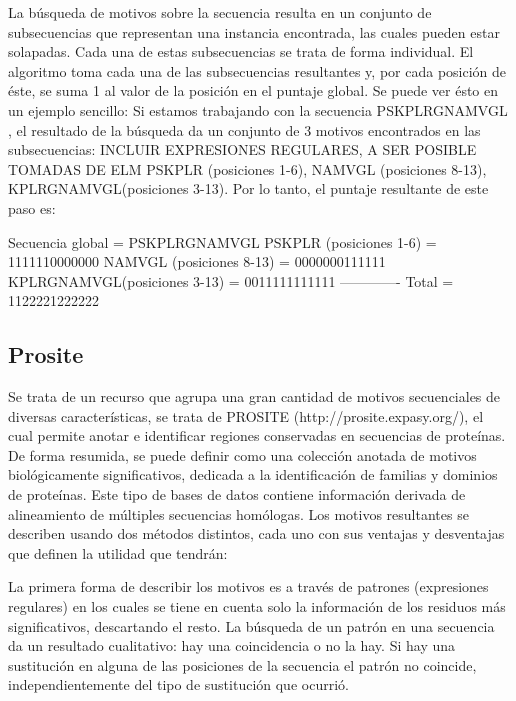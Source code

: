La búsqueda de motivos sobre la secuencia resulta en un conjunto de subsecuencias que representan una instancia encontrada, las cuales pueden estar solapadas. Cada una de estas subsecuencias se trata de forma individual.
El algoritmo toma cada una de las subsecuencias resultantes y, por cada posición de éste, se suma 1 al valor de la posición en el puntaje global.
Se puede ver ésto en un ejemplo sencillo:
Si estamos trabajando con la secuencia PSKPLRGNAMVGL , el resultado de la búsqueda da un conjunto de 3 motivos encontrados en las subsecuencias: INCLUIR EXPRESIONES REGULARES, A SER POSIBLE TOMADAS DE ELM
PSKPLR (posiciones 1-6), NAMVGL (posiciones 8-13), KPLRGNAMVGL(posiciones 3-13).
Por lo tanto, el puntaje resultante de este paso es:

Secuencia global             =   PSKPLRGNAMVGL
PSKPLR (posiciones 1-6)      =   1111110000000 
NAMVGL (posiciones 8-13)     =   0000000111111  
KPLRGNAMVGL(posiciones 3-13) =   0011111111111
 -------------
Total                        =   1122221222222










\subsection{Prosite}
Se trata de un recurso que agrupa una gran cantidad de motivos secuenciales de diversas características, se trata de PROSITE (http://prosite.expasy.org/), el cual permite anotar e identificar regiones conservadas en secuencias de proteínas.
De forma resumida, se puede definir como una colección anotada de motivos biológicamente significativos, dedicada a la identificación de familias y dominios de proteínas.
Este tipo de bases de datos contiene información derivada de alineamiento de múltiples secuencias homólogas. 
Los motivos resultantes se describen usando dos métodos distintos, cada uno con sus ventajas y desventajas que definen la utilidad que tendrán:

La primera forma de describir los motivos es a través de patrones (expresiones regulares) en los cuales se tiene en cuenta solo la información de los residuos más significativos, descartando el resto. La búsqueda de un patrón en una secuencia da un resultado cualitativo: hay una coincidencia o no la hay. Si hay una sustitución en alguna de las posiciones de la secuencia el patrón no coincide, independientemente del tipo de sustitución que ocurrió.

